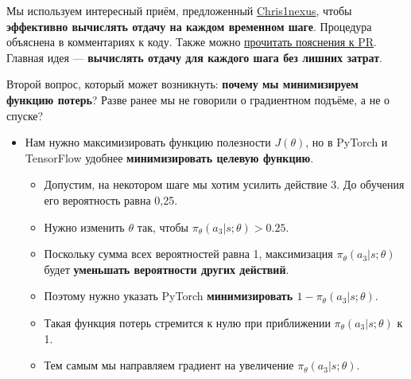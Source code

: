 \documentclass[11pt,a4paper]{article}
\begin{document}
Мы используем интересный приём, предложенный \href{https://github.com/Chris1nexus}{Chris1nexus}, чтобы \textbf{эффективно вычислять отдачу на каждом временном шаге}. Процедура объяснена в комментариях к коду. Также можно \href{https://github.com/huggingface/deep-rl-class/pull/95}{прочитать пояснения к PR}. Главная идея --- \textbf{вычислять отдачу для каждого шага без лишних затрат}.

Второй вопрос, который может возникнуть: \textbf{почему мы минимизируем функцию потерь}? Разве ранее мы не говорили о градиентном подъёме, а не о спуске?

\begin{itemize}
\tightlist
\item
  Нам нужно максимизировать функцию полезности \(J(\theta)\), но в PyTorch и TensorFlow удобнее \textbf{минимизировать целевую функцию}.

  \begin{itemize}
  \tightlist
  \item
    Допустим, на некотором шаге мы хотим усилить действие 3. До обучения его вероятность равна 0,25.
  \item
    Нужно изменить \(\theta\) так, чтобы \(\pi_\theta(a_3|s; \theta) > 0.25\).
  \item
    Поскольку сумма всех вероятностей равна 1, максимизация \(\pi_\theta(a_3|s; \theta)\) будет \textbf{уменьшать вероятности других действий}.
  \item
    Поэтому нужно указать PyTorch \textbf{минимизировать \(1 - \pi_\theta(a_3|s; \theta)\)}.
  \item
    Такая функция потерь стремится к нулю при приближении \(\pi_\theta(a_3|s; \theta)\) к 1.
  \item
    Тем самым мы направляем градиент на увеличение \(\pi_\theta(a_3|s; \theta)\).
  \end{itemize}
\end{itemize}
\end{document}
